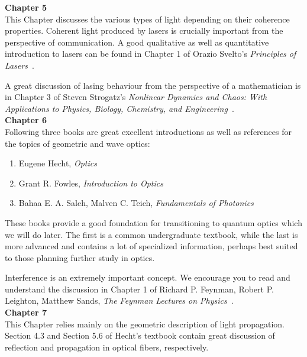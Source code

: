 {\bf Chapter 5}\\

This Chapter discusses the various types of light depending on their coherence properties. Coherent light produced by lasers is crucially important from the perspective of communication. A good qualitative as well as quantitative introduction to lasers can be found in Chapter 1 of Orazio Svelto's \emph{Principles of Lasers}~\cite{svelto2010principles}.

A great discussion of lasing behaviour from the perspective of a mathematician is in Chapter 3 of Steven Strogatz's \emph{Nonlinear Dynamics and Chaos: With Applications to Physics, Biology, Chemistry, and Engineering}~\cite{strogatz2018nonlinear}.\\

{\bf Chapter 6}\\

Following three books are great excellent introductions as well as references for the topics of geometric and wave optics:
\begin{enumerate}
    \item Eugene Hecht, \emph{Optics}~\cite{hecht2012optics}
    \item Grant R. Fowles, \emph{Introduction to Optics}~\cite{fowles1989introduction}
    \item Bahaa E. A. Saleh, Malven C. Teich, \emph{Fundamentals of Photonics}~\cite{saleh2019fundamentals}
\end{enumerate}

These books provide a good foundation for transitioning to quantum optics which we will do later.
The first is a common undergraduate textbook, while the last is more advanced and contains a lot of specialized information, perhaps best suited to those planning further study in optics.

Interference is an extremely important concept.
We encourage you to read and understand the discussion in Chapter 1 of
Richard P. Feynman, Robert P. Leighton, Matthew Sands, \emph{The Feynman Lectures on Physics}~\cite{feynman1971feynman}.\\

{\bf Chapter 7}\\

This Chapter relies mainly on the geometric description of light propagation. Section 4.3 and Section 5.6 of Hecht’s textbook contain great discussion of reflection and propagation in optical fibers, respectively.

